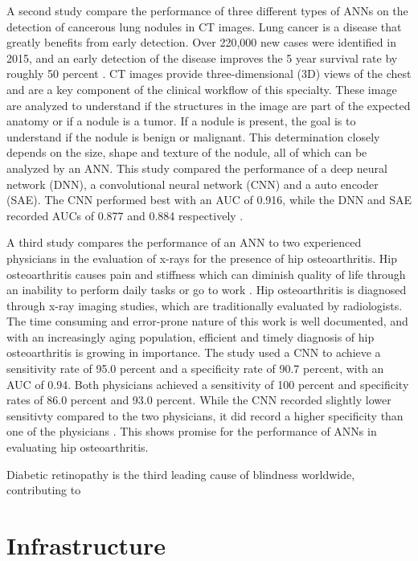 \documentclass[sigconf]{acmart}
\begin{document}
A second study compare the performance of three different types of ANNs on the detection of cancerous lung nodules  in CT images. Lung cancer is a disease that greatly benefits from early detection. Over 220,000 new cases were identified in 2015, and an early detection of the disease improves the 5 year survival rate by roughly 50 percent \cite{cite10}. CT images provide three-dimensional (3D) views of the chest and are a key component of the clinical workflow of this specialty. These image are analyzed to understand if the structures in the image are part of the expected anatomy or if a nodule is a tumor. If a nodule is present, the goal is to understand if the nodule is benign or malignant. This determination closely depends on the size, shape and texture of the nodule, all of which can be analyzed by an ANN. This study compared the performance of a deep neural network (DNN), a convolutional neural network (CNN) and a auto encoder (SAE). The CNN performed best with an AUC of 0.916, while the DNN and SAE recorded AUCs of 0.877 and 0.884 respectively \cite{cite10}.

A third study compares the performance of an ANN to two experienced physicians in the evaluation of x-rays for the presence of hip osteoarthritis. Hip osteoarthritis causes pain and stiffness which can diminish quality of life through an inability to perform daily tasks or go to work \cite{cite12}. Hip osteoarthritis is diagnosed through x-ray imaging studies, which are traditionally evaluated by radiologists. The time consuming and error-prone nature of this work is well documented, and with an increasingly aging population, efficient and timely diagnosis of hip osteoarthritis is growing in importance. The study used a CNN to achieve a sensitivity rate of 95.0 percent and a specificity rate of 90.7 percent, with an AUC of 0.94. Both physicians achieved a sensitivity of 100 percent and specificity rates of 86.0 percent and 93.0 percent. While the CNN recorded slightly lower sensitivty compared to the two physicians, it did record a higher specificity than one of the physicians \cite{cite12}. This shows promise for the performance of ANNs in evaluating hip osteoarthritis.



Diabetic retinopathy is the third leading cause of blindness worldwide, contributing to 

\section{Infrastructure}
\end{document}

